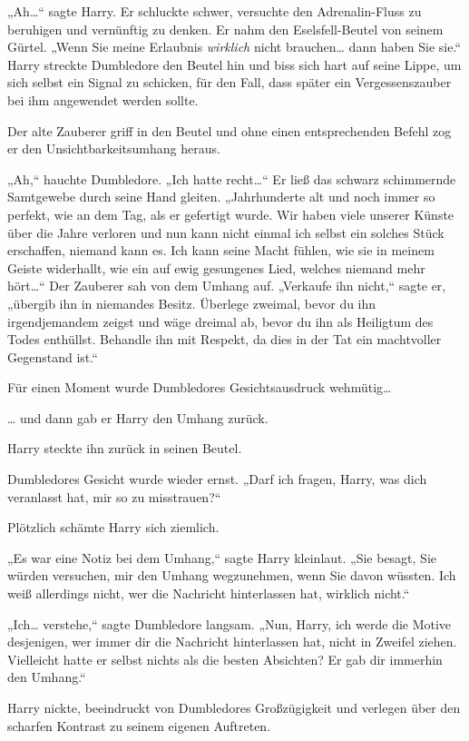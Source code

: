 {„Ah…“ sagte Harry. Er schluckte schwer, versuchte den Adrenalin-Fluss zu beruhigen und vernünftig zu denken. Er nahm den Eselsfell-Beutel von seinem Gürtel. „Wenn Sie meine Erlaubnis \emph{wirklich} nicht brauchen… dann haben Sie sie.“ Harry streckte Dumbledore den Beutel hin und biss sich hart auf seine Lippe, um sich selbst ein Signal zu schicken, für den Fall, dass später ein Vergessenszauber bei ihm angewendet werden sollte.

Der alte Zauberer griff in den Beutel und ohne einen entsprechenden Befehl zog er den Unsichtbarkeitsumhang heraus.

„Ah,“ hauchte Dumbledore. „Ich hatte recht…“ Er ließ das schwarz schimmernde Samtgewebe durch seine Hand gleiten. „Jahrhunderte alt und noch immer so perfekt, wie an dem Tag, als er gefertigt wurde. Wir haben viele unserer Künste über die Jahre verloren und nun kann nicht einmal ich selbst ein solches Stück erschaffen, niemand kann es. Ich kann seine Macht fühlen, wie sie in meinem Geiste widerhallt, wie ein auf ewig gesungenes Lied, welches niemand mehr hört…“ Der Zauberer sah von dem Umhang auf. „Verkaufe ihn nicht,“ sagte er, „übergib ihn in niemandes Besitz. Überlege zweimal, bevor du ihn irgendjemandem zeigst und wäge dreimal ab, bevor du ihn als Heiligtum des Todes enthüllst. Behandle ihn mit Respekt, da dies in der Tat ein machtvoller Gegenstand ist.“

Für einen Moment wurde Dumbledores Gesichtsausdruck wehmütig…

… und dann gab er Harry den Umhang zurück.

Harry steckte ihn zurück in seinen Beutel.

Dumbledores Gesicht wurde wieder ernst. „Darf ich fragen, Harry, was dich veranlasst hat, mir so zu misstrauen?“

Plötzlich schämte Harry sich ziemlich.

„Es war eine Notiz bei dem Umhang,“ sagte Harry kleinlaut. „Sie besagt, Sie würden versuchen, mir den Umhang wegzunehmen, wenn Sie davon wüssten. Ich weiß allerdings nicht, wer die Nachricht hinterlassen hat, wirklich nicht.“

„Ich… verstehe,“ sagte Dumbledore langsam. „Nun, Harry, ich werde die Motive desjenigen, wer immer dir die Nachricht hinterlassen hat, nicht in Zweifel ziehen. Vielleicht hatte er selbst nichts als die besten Absichten? Er gab dir immerhin den Umhang.“

Harry nickte, beeindruckt von Dumbledores Großzügigkeit und verlegen über den scharfen Kontrast zu seinem eigenen Auftreten.

}
